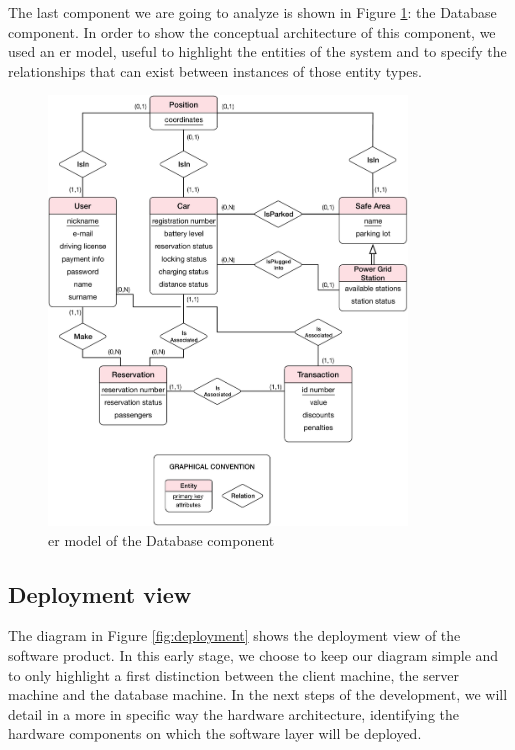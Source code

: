 \newline
The last component we are going to analyze is shown in Figure \ref{fig:database}: the Database component. In order to show the conceptual architecture of this component, we used an \acl{er} model, useful to highlight the entities of the system and to specify the relationships that can exist between instances of those entity types.

\begin{figure}[htbp]
\centering
\vspace{24pt}
\includegraphics[width=0.85\textwidth]{Images/DatabaseComponent.pdf}
\vspace{10pt}
\caption{\acs{er} model of the Database component}
\label{fig:database}
\end{figure}
\clearpage

\subsection{Deployment view} \label{subsec:depl-view}

The diagram in Figure \ref{fig:deployment} shows the deployment view of the software product. In this early stage, we choose to keep our diagram simple and to only highlight a first distinction between the client machine, the server machine and the database machine.
In the next steps of the development, we will detail in a more in specific way the hardware architecture, identifying the hardware components on which the software layer will be deployed.

